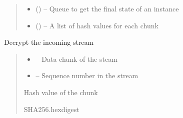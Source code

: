 \documentclass[letterpaper,10pt,english]{sphinxmanual}
\begin{document}
\begin{savenotes}
\begin{fulllineitems}
\begin{quote}
\begin{description}
\begin{itemize}
\item {} 
\sphinxAtStartPar
{} () – Queue to get the final state of an instance

\item {} 
\sphinxAtStartPar
{} (\sphinxstyleliteralemphasis{\sphinxupquote{{[}}}\sphinxstyleliteralemphasis{\sphinxupquote{{]}}}) – A list of hash values for each chunk

\end{itemize}

\end{description}\end{quote}

\begin{savenotes}\begin{fulllineitems}
\label{\detokenize{eezz:eezz.filesrv.TEezzFile.decrypt}}
\pysigstartsignatures
{}
\pysigstopsignatures
\sphinxAtStartPar
Decrypt the incoming stream
\begin{quote}\begin{description}
\begin{itemize}
\item {} 
\sphinxAtStartPar
{} – Data chunk of the steam

\item {} 
\sphinxAtStartPar
{} – Sequence number in the stream

\end{itemize}

\sphinxAtStartPar
Hash value of the chunk

\sphinxAtStartPar
SHA256.hexdigest

\end{description}\end{quote}


\end{fulllineitems}
\end{savenotes}
\end{fulllineitems}
\end{savenotes}
\end{document}
